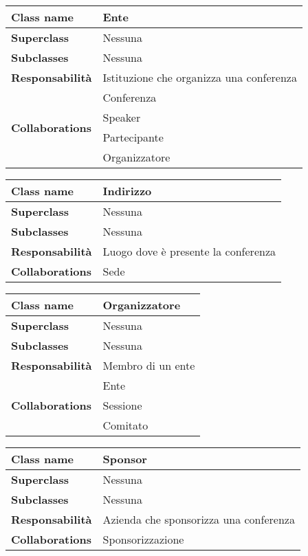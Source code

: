 \begin{table}[h!]
\begin{tabular}{|l|l|}
		\hline
		\textbf{Class name} & Ente \\ \hline
		\textbf{Superclass} & Nessuna \\ \hline
		\textbf{Subclasses} & Nessuna  \\ \hline
		\textbf{Responsabilità} & Istituzione che organizza una conferenza \\ \hline
		\multirow{4}{*}{\textbf{Collaborations}} & Conferenza \\ 
		& Speaker \\
		& Partecipante \\
		& Organizzatore \\ \hline
\end{tabular}
\end{table}

\begin{table}[h!]
\begin{tabular}{|l|l|}
		\hline
		\textbf{Class name} & Indirizzo \\ \hline
		\textbf{Superclass} & Nessuna \\ \hline
		\textbf{Subclasses} & Nessuna  \\ \hline
		\textbf{Responsabilità} & Luogo dove è presente la conferenza \\ \hline
		\multirow{1}{*}{\textbf{Collaborations}} & Sede \\ \hline
	\end{tabular}
\end{table}

\begin{table}[h!]
	\begin{tabular}{|l|l|}
		\hline
		\textbf{Class name} & Organizzatore \\ \hline
		\textbf{Superclass} & Nessuna \\ \hline
		\textbf{Subclasses} & Nessuna  \\ \hline
		\textbf{Responsabilità} & Membro di un ente \\ \hline
		\multirow{3}{*}{\textbf{Collaborations}} & Ente \\ 
		& Sessione \\ 
		& Comitato \\ \hline
	\end{tabular}
\end{table}
\begin{table}
\begin{tabular}{|l|l|}
	\hline
	\textbf{Class name} & Sponsor \\ \hline
	\textbf{Superclass} & Nessuna \\ \hline
	\textbf{Subclasses} & Nessuna  \\ \hline
	\textbf{Responsabilità} & Azienda che sponsorizza una conferenza \\ \hline
	\multirow{1}{*}{\textbf{Collaborations}} & Sponsorizzazione \\ \hline
\end{tabular}
\end{table}

